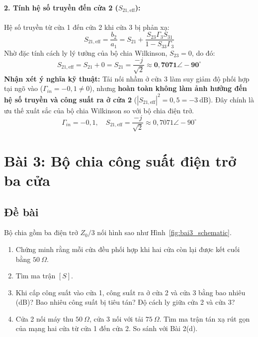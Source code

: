 \documentclass[12pt,a4paper]{article}
\begin{document}
\paragraph{2. Tính hệ số truyền đến cửa 2 ($S_{21,\text{eff}}$):}
Hệ số truyền từ cửa 1 đến cửa 2 khi cửa 3 bị phản xạ:
\[
S_{21,\text{eff}} = \frac{b_2}{a_1} = S_{21} + \frac{S_{23} \Gamma_3 S_{31}}{1 - S_{33}\Gamma_3}
\]
Nhờ đặc tính cách ly lý tưởng của bộ chia Wilkinson, $S_{23} = 0$, do đó:
\[
S_{21,\text{eff}} = S_{21} + 0 = S_{21} = \frac{-j}{\sqrt{2}} \approx \mathbf{0{,}7071 \angle -90^\circ}
\]
\textbf{Nhận xét ý nghĩa kỹ thuật:} Tải nối nhầm ở cửa 3 làm suy giảm độ phối hợp tại ngõ vào ($\Gamma_{in} = -0{,}1 \neq 0$), nhưng \textbf{hoàn toàn không làm ảnh hưởng đến hệ số truyền và công suất ra ở cửa 2} ($|S_{21,\text{eff}}|^2 = 0{,}5 = -3~\text{dB}$). Đây chính là ưu thế xuất sắc của bộ chia Wilkinson so với bộ chia điện trở.
\[
\boxed{\Gamma_{in} = -0{,}1, \quad S_{21,\text{eff}} = \frac{-j}{\sqrt{2}} \approx 0{,}7071\angle -90^\circ}
\]

\newpage

\section{Bài 3: Bộ chia công suất điện trở ba cửa}

\subsection{Đề bài}
Bộ chia gồm ba điện trở $Z_0/3$ nối hình sao như Hình~\ref{fig:bai3_schematic}.
\begin{enumerate}
    \item[(a)] Chứng minh rằng mỗi cửa đều phối hợp khi hai cửa còn lại được kết cuối bằng $50~\Omega$.
    \item[(b)] Tìm ma trận $[S]$.
    \item[(c)] Khi cấp công suất vào cửa 1, công suất ra ở cửa 2 và cửa 3 bằng bao nhiêu (dB)? Bao nhiêu công suất bị tiêu tán? Độ cách ly giữa cửa 2 và cửa 3?
    \item[(d)] Cửa 2 nối máy thu $50~\Omega$, cửa 3 nối với tải $75~\Omega$. Tìm ma trận tán xạ rút gọn của mạng hai cửa từ cửa 1 đến cửa 2. So sánh với Bài 2(d).
\end{enumerate}
\end{document}
